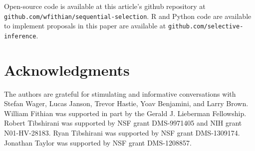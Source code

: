 \documentclass{article}
\begin{document}
Open-source code is available at this article's github repository at \texttt{github.com/wfithian/sequential-selection}. R and Python code are available to implement proposals in this paper are available at \texttt{github.com/selective-inference}.

\section*{Acknowledgments}

The authors are grateful for stimulating and informative conversations with Stefan Wager, Lucas Janson, Trevor Hastie, Yoav Benjamini, and Larry Brown. William Fithian was supported in part by the Gerald J. Lieberman Fellowship. Robert Tibshirani was supported by NSF grant DMS-9971405 and NIH grant N01-HV-28183. Ryan Tibshirani was supported by NSF grant DMS-1309174. Jonathan Taylor was supported by NSF grant DMS-1208857.




\newpage
\end{document}
